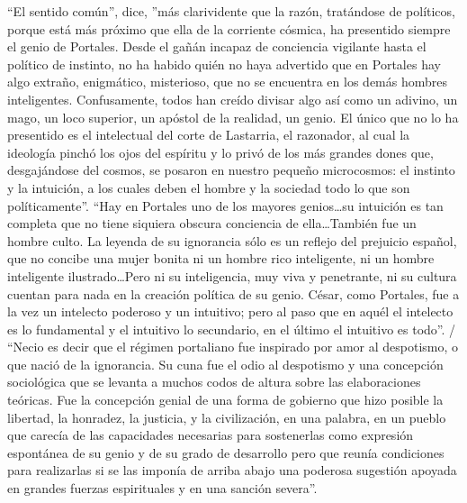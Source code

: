 \documentclass[10pt,twoside,openright]{memoir}
\begin{document}
``El sentido común'', dice, ''más clarividente que la razón, tratándose de
políticos, porque está más próximo que ella de la corriente cósmica, ha
presentido siempre el genio de Portales. Desde el gañán incapaz de
conciencia vigilante hasta el político de instinto, no ha habido quién
no haya advertido que en Portales hay algo extraño, enigmático,
misterioso, que no se encuentra en los demás hombres inteligentes.
Confusamente, todos han creído divisar algo así como un adivino, un
mago, un loco superior, un apóstol de la realidad, un genio. El único
que no lo ha presentido es el intelectual del corte de Lastarria, el
razonador, al cual la ideología pinchó los ojos del espíritu y lo privó
de los más grandes dones que, desgajándose del cosmos, se posaron en
nuestro pequeño microcosmos: el instinto y la intuición, a los cuales
deben el hombre y la sociedad todo lo que son políticamente''. ``Hay en
Portales uno de los mayores genios\ldots su intuición es tan completa que
no tiene siquiera obscura conciencia de ella\ldots También fue un hombre
culto. La leyenda de su ignorancia sólo es un reflejo del prejuicio
español, que no concibe una mujer bonita ni un hombre rico inteligente,
ni un hombre inteligente ilustrado\ldots Pero ni su inteligencia, muy viva
y penetrante, ni su cultura cuentan para nada en la creación política de
su genio. César, como Portales, fue a la vez un intelecto poderoso y un
intuitivo; pero al paso que en aquél el intelecto es lo fundamental y el
intuitivo lo secundario, en el último el intuitivo es todo''. / ``Necio es
decir que el régimen portaliano fue inspirado por amor al despotismo, o
que nació de la ignorancia. Su cuna fue el odio al despotismo y una
concepción sociológica que se levanta a muchos codos de altura sobre las
elaboraciones teóricas. Fue la concepción genial de una forma de
gobierno que hizo posible la libertad, la honradez, la justicia, y la
civilización, en una palabra, en un pueblo que carecía de las
capacidades necesarias para sostenerlas como expresión espontánea de su
genio y de su grado de desarrollo pero que reunía condiciones para
realizarlas si se las imponía de arriba abajo una poderosa sugestión
apoyada en grandes fuerzas espirituales y en una sanción severa''.
\end{document}
